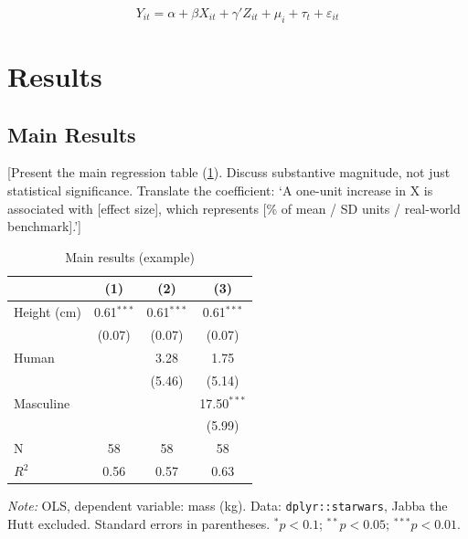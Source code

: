 \begin{equation}
    Y_{it} = \alpha + \beta X_{it} + \gamma' Z_{it} + \mu_i + \tau_t + \varepsilon_{it}
    \label{eq:main}
\end{equation}

\section{Results}\label{sec:results} %

\subsection{Main Results} %
[Present the main regression table (\cref{tab:results}). Discuss substantive magnitude, not just statistical significance. Translate the coefficient: `A one-unit increase in X is associated with [effect size], which represents [\% of mean / SD units / real-world benchmark].']

\begin{table}[htbp]
    \centering
    \begin{threeparttable}
        \caption{Main results (example)}
        \label{tab:results}
        \begin{tabular}{l*{3}{c}}
            \toprule
                        & (1)           & (2)           & (3)           \\
            \midrule
            Height (cm) & 0.61$^{***}$  & 0.61$^{***}$  & 0.61$^{***}$  \\
                        & (0.07)        & (0.07)        & (0.07)        \\
            Human       &               & 3.28          & 1.75          \\
                        &               & (5.46)        & (5.14)        \\
            Masculine   &               &               & 17.50$^{***}$ \\
                        &               &               & (5.99)        \\
            \midrule
            N           & 58            & 58            & 58            \\
            $R^2$       & 0.56          & 0.57          & 0.63          \\
            \bottomrule
        \end{tabular}
        \begin{tablenotes}[flushleft]
            \footnotesize
            \item \textit{Note:} OLS, dependent variable: mass (kg). Data: \texttt{dplyr::starwars}, Jabba the Hutt excluded. Standard errors in parentheses. $^{*}p<0.1$; $^{**}p<0.05$; $^{***}p<0.01$.
        \end{tablenotes}
    \end{threeparttable}
\end{table}

